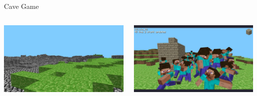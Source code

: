 \documentclass[handout]{beamer}
\begin{document}
    \begin{frame}{Cave Game}
        \begin{columns}
            \begin{column}{0.5\textwidth}
                \includegraphics[width=\textwidth]{img/mine1.jpg}
            \end{column}
            \begin{column}{0.5\textwidth}
                \includegraphics[width=\textwidth]{img/mine2.jpg}
            \end{column}
        \end{columns}
    \end{frame}
\end{document}
